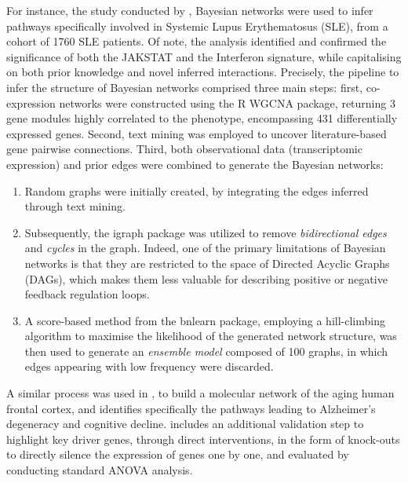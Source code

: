 For instance, the study conducted by \autocite{li_etal19}, Bayesian networks were used to infer pathways specifically involved in Systemic Lupus Erythematosus (SLE), from a cohort of 1760 SLE patients. Of note, the analysis identified and confirmed the significance of both the JAKSTAT and the Interferon signature, while capitalising on both prior knowledge and novel inferred interactions. Precisely, the pipeline to infer the structure of Bayesian networks comprised three main steps: first, co-expression networks were constructed using the R WGCNA package, returning 3 gene modules highly correlated to the phenotype, encompassing 431 differentially expressed genes. Second, text mining was employed to uncover literature-based gene pairwise connections. Third, both observational data (transcriptomic expression) and prior edges were combined to generate the Bayesian networks: 
\begin{enumerate}
\item  Random graphs were initially created, by integrating the edges inferred through text mining.

\item Subsequently, the igraph package was utilized to remove \emph{bidirectional edges} and \emph{cycles} in the graph. Indeed, one of the primary limitations of Bayesian networks is that they are restricted to the space of Directed Acyclic Graphs (DAGs), which makes them less valuable for describing positive or negative feedback regulation loops.

\item A score-based method from the bnlearn package, employing a hill-climbing algorithm to maximise the likelihood of the generated network structure, was then used to generate an \emph{ensemble model} composed of 100 graphs, in which edges appearing with low frequency were discarded.
\end{enumerate}
A similar process was used in \autocite{mostafavi_etal18}, to build a molecular network of the aging human frontal cortex, and identifies specifically the pathways leading to Alzheimer’s degeneracy and cognitive decline. \autocite{mostafavi_etal18} includes an additional validation step to highlight key driver genes, through direct interventions, in the form of knock-outs to directly silence the expression of genes one by one, and evaluated by conducting standard ANOVA analysis.

